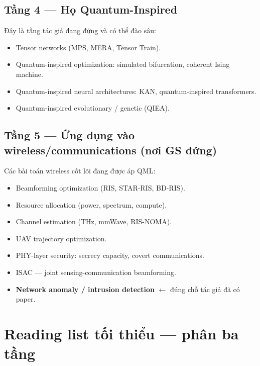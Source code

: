 \documentclass[11pt,a4paper]{article}
\begin{document}
\subsection{Tầng 4 --- Họ Quantum-Inspired}

Đây là tầng tác giả đang đứng và có thể đào sâu:
\begin{itemize}
  \item Tensor networks (MPS, MERA, Tensor Train).
  \item Quantum-inspired optimization: simulated bifurcation, coherent Ising machine.
  \item Quantum-inspired neural architectures: KAN, quantum-inspired transformers.
  \item Quantum-inspired evolutionary / genetic (QIEA).
\end{itemize}

\subsection{Tầng 5 --- Ứng dụng vào wireless/communications (nơi GS đứng)}
Các bài toán wireless cốt lõi đang được áp QML:
\begin{itemize}
  \item Beamforming optimization (RIS, STAR-RIS, BD-RIS).
  \item Resource allocation (power, spectrum, compute).
  \item Channel estimation (THz, mmWave, RIS-NOMA).
  \item UAV trajectory optimization.
  \item PHY-layer security: secrecy capacity, covert communications.
  \item ISAC --- joint sensing-communication beamforming.
  \item \textbf{Network anomaly / intrusion detection} $\leftarrow$ đúng chỗ tác giả đã có paper.
\end{itemize}

\section{Reading list tối thiểu --- phân ba tầng}
\end{document}
